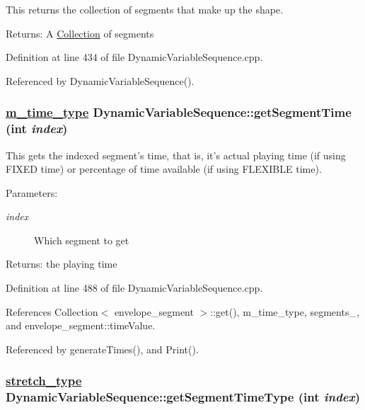This returns the collection of segments that make up the shape. \begin{Desc}
\item[Returns:]A \hyperlink{classCollection}{Collection} of segments \end{Desc}


Definition at line 434 of file Dynamic\-Variable\-Sequence.cpp.

Referenced by Dynamic\-Variable\-Sequence().\hypertarget{classDynamicVariableSequence_a18}{
\subsubsection[getSegmentTime]{\setlength{\rightskip}{0pt plus 5cm}\hyperlink{Types_8h_a2}{m\_\-time\_\-type} Dynamic\-Variable\-Sequence::get\-Segment\-Time (int {\em index})}}
\label{classDynamicVariableSequence_a18}


This gets the indexed segment's time, that is, it's actual playing time (if using FIXED time) or percentage of time available (if using FLEXIBLE time). \begin{Desc}
\item[Parameters:]
\begin{description}
\item[{\em index}]Which segment to get \end{description}
\end{Desc}
\begin{Desc}
\item[Returns:]the playing time \end{Desc}


Definition at line 488 of file Dynamic\-Variable\-Sequence.cpp.

References Collection$<$ envelope\_\-segment $>$::get(), m\_\-time\_\-type, segments\_\-, and envelope\_\-segment::time\-Value.

Referenced by generate\-Times(), and Print().\hypertarget{classDynamicVariableSequence_a20}{
\subsubsection[getSegmentTimeType]{\setlength{\rightskip}{0pt plus 5cm}\hyperlink{Types_8h_a12}{stretch\_\-type} Dynamic\-Variable\-Sequence::get\-Segment\-Time\-Type (int {\em index})}}
\label{classDynamicVariableSequence_a20}


